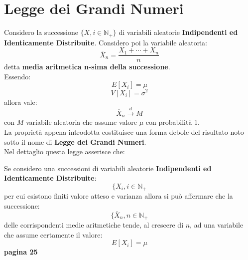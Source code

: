 \documentclass[a4paper,12pt, oneside]{book}
\newcommand{\numberset}{\mathbb}
\newcommand{\N}{\numberset{N}}
\begin{document}
\section{Legge dei Grandi Numeri}
Considero la successione $\{X,i\in\mathbb{N}_+\}$ di variabili aleatorie \textbf{Indipendenti ed Identicamente Distribuite}. Considero poi la variabile aleatoria:
\[\overline{X}_n=\frac{X_1+\cdots+X_n}{n}\]
detta \textbf{media aritmetica n-sima della successione}.\\
Essendo:
\[E[X_i]=\mu\]
\[V[X_i]=\sigma^2\]
allora vale:
\[\overline{X}_n\stackrel{d}{\longrightarrow}M\]
con $M$ variabile aleatoria che assume valore $\mu$ con probabilità 1.\\
La proprietà appena introdotta costituisce una forma debole del risultato noto sotto il nome di \textbf{Legge dei Grandi Numeri}.\\
Nel dettaglio questa legge asserisce che:
\begin{shaded}
Se considero una successioni di variabili aleatorie \textbf{Indipendenti ed Identicamente Distribuite}:
\[\{X_i,i\in\N_+\]
per cui esistono finiti valore atteso e varianza allora si può affermare che la successione:
\[\{\overline{X}_n,n\in\N_+\]
delle corrispondenti medie aritmetiche tende, al crescere di $n$, ad una variabile che assume certamente il valore:
\[E[X_i]=\mu\]
\textbf{pagina 25}
\end{shaded}
\end{document}

